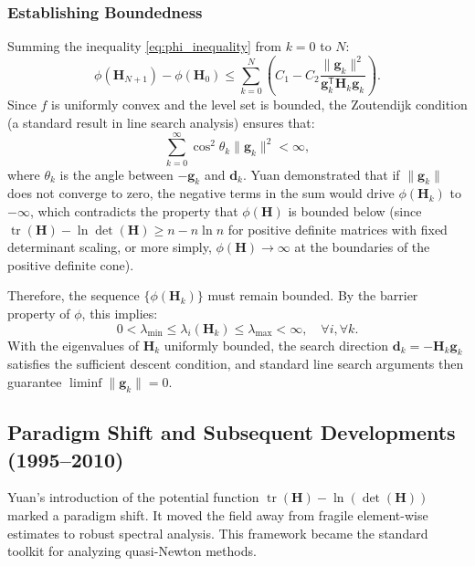 \documentclass[12pt,a4paper]{article}  %
\theoremstyle{definition}
\numberwithin{equation}{section}
\DeclareMathOperator{\tr}{tr}
\newcommand{\HH}{\bm{H}}
\newcommand{\trans}{{\scriptstyle{\mathsf{T}}}}
\newcommand{\dd}{\mathbf{d}}
\renewcommand{\ggg}{\mathbf{g}}
\begin{document}
\subsubsection{Establishing Boundedness}
Summing the inequality \eqref{eq:phi_inequality} from $k=0$ to $N$:
\begin{equation}
    \phi(\HH_{N+1}) - \phi(\HH_0) \le \sum_{k=0}^N \left( C_1 - C_2 \frac{\|\ggg_k\|^2}{\ggg_k^\trans \HH_k \ggg_k} \right).
\end{equation}
Since $f$ is uniformly convex and the level set is bounded, the Zoutendijk condition (a standard result in line search analysis) ensures that:
\begin{equation}
    \sum_{k=0}^\infty \cos^2 \theta_k \|\ggg_k\|^2 < \infty,
\end{equation}
where $\theta_k$ is the angle between $-\ggg_k$ and $\dd_k$.
Yuan demonstrated that if $\|\ggg_k\|$ does not converge to zero, the negative terms in the sum would drive $\phi(\HH_k)$ to $-\infty$, which contradicts the property that $\phi(\mathbf{H})$ is bounded below (since $\tr(\mathbf{H}) - \ln \det(\mathbf{H}) \ge n - n \ln n$ for positive definite matrices with fixed determinant scaling, or more simply, $\phi(\mathbf{H}) \to \infty$ at the boundaries of the positive definite cone).

Therefore, the sequence $\{\phi(\HH_k)\}$ must remain bounded. By the barrier property of $\phi$, this implies:
\begin{equation}
    0 < \lambda_{\min} \le \lambda_i(\HH_k) \le \lambda_{\max} < \infty, \quad \forall i, \forall k.
\end{equation}
With the eigenvalues of $\HH_k$ uniformly bounded, the search direction $\dd_k = -\HH_k \ggg_k$ satisfies the sufficient descent condition, and standard line search arguments then guarantee $\liminf \|\ggg_k\| = 0$.

\subsection{Paradigm Shift and Subsequent Developments (1995--2010)}
Yuan's introduction of the potential function $\tr(\mathbf{H}) - \ln(\det(\mathbf{H}))$ marked a paradigm shift. It moved the field away from fragile element-wise estimates to robust spectral analysis. This framework became the standard toolkit for analyzing quasi-Newton methods.
\end{document}
